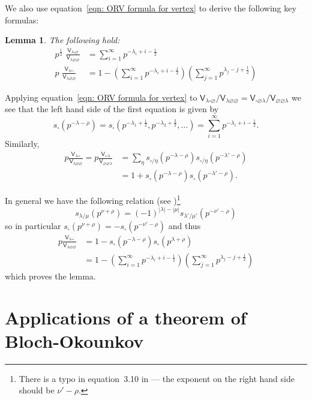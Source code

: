 \documentclass[12pt]{amsart}
\newcommand{\Vsf}{\mathsf{V}}
\newcommand{\bx}{\square}
\renewcommand{\emptyset}{\varnothing}
\newcommand{\half}{\frac{1}{2}}
\newtheorem{lemma}[theorem]{Lemma}
\theoremstyle{definition}
\begin{document}
We also use equation~\ref{eqn: ORV formula for vertex} to derive the
following key formulas:
\begin{lemma}\label{lem: eqns for Vlambdaboxempty/Vlambdaemptyempty
and Vlambdaboxbox/Vlambdaemptyempty} 
The following hold:
\begin{align*}
p^{\half }\,\,  \frac{\Vsf_{\lambda \bx \emptyset}}{\Vsf_{\lambda
\emptyset \emptyset}} &= \sum_{i=1}^{\infty} p^{-\lambda_{i}+i-\half }\\
p\,\,  \frac{\Vsf_{\lambda \bx \bx}}{\Vsf_{\lambda
\emptyset \emptyset}} &= 1-\left(\sum_{i=1}^{\infty}
p^{-\lambda_{i}+i-\half } \right) \left(\sum_{j=1}^{\infty} p^{\lambda_{j}-j+\half } \right)
\end{align*}
\end{lemma}
\proof Applying equation~\eqref{eqn: ORV formula for vertex} to
$\Vsf_{\lambda \bx \emptyset}/\Vsf_{\lambda \emptyset
\emptyset}=\Vsf_{\bx \emptyset \lambda}/\Vsf_{\emptyset \emptyset
\lambda}$ we see that the left hand side of the first equation is
given by
\[
s_{\bx}(p^{-\lambda -\rho})=s_{\bx}
(p^{-\lambda_{1}+\half },p^{-\lambda_{2}+\frac{3}{2}},\dots ) =
\sum_{i=1}^{\infty} p^{-\lambda_{i}+i-\half }.
\]
Similarly, 
\begin{align*}
p\frac{\Vsf_{\lambda \bx \bx}}{\Vsf_{\lambda \emptyset \emptyset}} =
p\frac{\Vsf_{\bx \bx \lambda}}{\Vsf_{\emptyset \emptyset \lambda }} &=
\sum_{\eta} s_{\bx /\eta}(p^{-\lambda -\rho} )  s_{\bx /\eta}(p^{-\lambda' -\rho} )  \\
&= 1 + s_{\bx}(p^{-\lambda -\rho })s_{\bx}(p^{-\lambda' -\rho }).
\end{align*}

In general we have the following relation (see
\cite[Eqn~(3.10)]{Ok-Re-Va})\footnote{There is a typo in equation~3.10 in
\cite{Ok-Re-Va} --- the exponent on the right hand side should be $\nu '-\rho$. }
\[
s_{\lambda /\mu}(p^{\nu +\rho}) = (-1)^{|\lambda |-|\mu |}s_{\lambda
'/\mu '}(p^{-\nu '-\rho})
\]
so in particular $s_{\bx}(p^{\nu +\rho})=-s_{\bx}(p^{-\nu '-\rho})$
and thus
\begin{align*}
p\frac{\Vsf_{\lambda \bx \bx}}{\Vsf_{\lambda \emptyset \emptyset}} &=
1 - s_{\bx}(p^{-\lambda -\rho })s_{\bx}(p^{\lambda +\rho })\\
&= 1-\left(\sum_{i=1}^{\infty} p^{-\lambda_{i}+i-\half }
\right)\left(\sum_{j=1}^{\infty} p^{\lambda_{j}-j+\half } \right)
\end{align*}
which proves the lemma.

\section{Applications of a theorem of Bloch-Okounkov}
\label{sec: applications of the Bloch-Okounkov thm}
\end{document}
